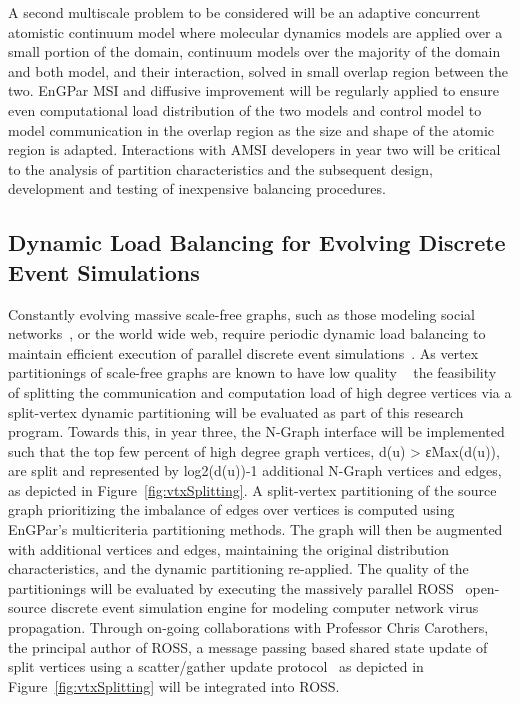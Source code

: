 \documentclass[12pt]{article}
\begin{document}
A second multiscale problem to be considered will be an adaptive concurrent
atomistic continuum model where molecular dynamics models are applied over a
small portion of the domain, continuum models over the majority of the domain
and both model, and their interaction, solved in small overlap region between
the two.
EnGPar MSI and diffusive improvement will be regularly applied to ensure even
computational load distribution of the two models and control model to model
communication in the overlap region as the size and shape of the atomic region
is adapted.
Interactions with AMSI developers in year two will be critical to the analysis
of partition characteristics and the subsequent design, development and testing
of inexpensive balancing procedures.

\subsection{Dynamic Load Balancing for Evolving Discrete Event Simulations} 
Constantly evolving massive scale-free graphs, such as those modeling social
networks~\cite{twitter2010,kwak2010twitter}, or the world wide web, require
periodic dynamic load balancing to maintain efficient execution of parallel
discrete event simulations~\cite{carothers2002ross}.
As vertex partitionings of scale-free graphs are known to have low quality
~\cite{abou2006multilevel,lang2004finding,leskovec2009community,pienta2013parallel} the feasibility of splitting the communication and computation
load of high degree vertices via a split-vertex dynamic partitioning will be
evaluated as part of this research program.
Towards this, in year three, the N-Graph interface will be implemented such
that the top few percent of high degree graph vertices, d(u) > εMax(d(u)), are
split and represented by log2(d(u))-1 additional N-Graph vertices and edges, as
depicted in Figure~\ref{fig:vtxSplitting}.
A split-vertex partitioning of the source graph prioritizing the imbalance of
edges over vertices is computed using EnGPar’s multicriteria partitioning
methods.
The graph will then be augmented with additional vertices and edges,
maintaining the original distribution characteristics, and the dynamic
partitioning re-applied.
The quality of the partitionings will be evaluated by executing the massively
parallel ROSS~\cite{carothers2002ross,mubarak2012modeling,barnes2013warp}
open-source discrete event simulation engine for modeling computer network virus
propagation.
Through on-going collaborations with Professor Chris Carothers, the principal
author of ROSS, a message passing based shared state update of split vertices
using a scatter/gather update
protocol~\cite{gonzalez2012powergraph,sahni2009scalable} as depicted in
Figure~\ref{fig:vtxSplitting} will be integrated into ROSS.
\end{document}
